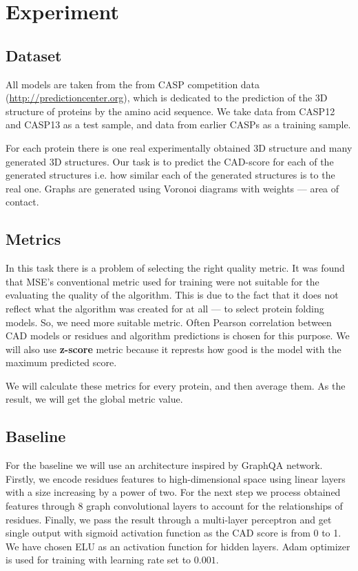 \documentclass[12pt,twoside]{article}
\begin{document}
	\section{Experiment}
	\subsection{Dataset}
	All models are taken from the from CASP competition data (\url{http://predictioncenter.org}), which is dedicated to the prediction 
	of the 3D structure of proteins by the amino acid sequence. We take data from CASP12 and CASP13 as a test sample, and data from
	earlier CASPs as a training sample.

	For each protein there is one real experimentally obtained 3D structure and many generated 3D structures. Our task is to predict 
	the CAD-score \cite{Olechnovic2012} for each of the generated structures i.e. how similar each of the generated structures is to the real one.
	Graphs are generated using Voronoi diagrams with weights — area of contact.

	\subsection{Metrics}
	In this task there is a problem of selecting the right quality metric. It was found that MSE's conventional metric used
	for training were not suitable for the evaluating the quality of the algorithm. This is due to the fact that it does not 
	reflect what the algorithm was created for at all — to select protein folding models. So, we need more suitable metric.
	Often Pearson correlation between CAD models or residues and algorithm predictions is chosen for this purpose\cite{Baldassarre2020GRAPHQAPM}.
	We will also use \textbf{z-score} metric because it represts how good is the model with the
	maximum predicted score.

	We will calculate these metrics for every protein, and then average them. As the result, we will get the global metric value.

	\subsection{Baseline}
	For the baseline we will use an architecture inspired by GraphQA\cite{Baldassarre2020GRAPHQAPM} network. Firstly, we encode residues features
	to high-dimensional space using linear layers with a size increasing by a power of two. For the next step we process obtained features through
	8 graph convolutional layers to account for the relationships of residues. Finally, we pass the result through a multi-layer perceptron and get
	single output with sigmoid activation function as the CAD score is from 0 to 1. We have chosen ELU as an activation function for hidden layers.
	Adam optimizer\cite{Kingma2014} is used for training with learning rate set to $0.001$.
\end{document}
